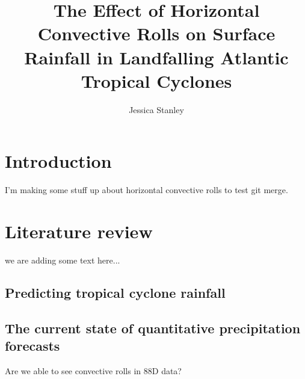 \documentclass[12pt]{article}
\author{Jessica Stanley} \title{The Effect of Horizontal Convective Rolls on Surface Rainfall in Landfalling Atlantic Tropical Cyclones}
\begin{document}
\maketitle


\section{Introduction}

I'm making some stuff up about horizontal convective rolls to test git merge.

\section{Literature review}

we are adding some text here...

\subsection{Predicting tropical cyclone rainfall} 

\subsection{The current state of quantitative precipitation forecasts}

Are we able to see convective rolls in 88D data?
\end{document}
